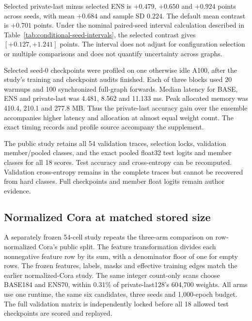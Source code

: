 Selected private-last minus selected ENS is $+0.479$, $+0.650$ and
$+0.924$ points across seeds, with mean $+0.684$ and sample SD $0.224$.
The default mean contrast is $+0.701$ points. Under the nominal paired-seed
interval calculation described in Table~\ref{tab:conditional-seed-intervals},
the selected contrast gives $[+0.127,+1.241]$ points. The interval does
not adjust for configuration selection or multiple comparisons and does
not quantify uncertainty across graphs.

Selected seed-0 checkpoints were profiled on one otherwise idle A100,
after the study's training and checkpoint audits finished. Each of three
blocks used 20 warmups and 100 synchronized full-graph forwards.
Median latency for BASE, ENS and private-last was 4.481, 8.562 and
11.133 ms. Peak allocated memory was 410.4, 210.1 and 277.8 MB.
Thus the private-last accuracy gain over the ensemble accompanies
higher latency and allocation at almost equal weight count.
The exact timing records and profile source accompany the supplement.

The public study retains all 54 validation traces, selection locks,
validation member/pooled classes, and the exact pooled float32 test
logits and member classes for all 18 scores. Test accuracy and
cross-entropy can be recomputed. Validation cross-entropy remains in
the complete traces but cannot be recovered from hard classes.
Full checkpoints and member float logits remain author evidence.


\subsection{Normalized Cora at matched stored size}
A separately frozen 54-cell study repeats the three-arm comparison on
row-normalized Cora's public split. The feature transformation divides
each nonnegative feature row by its sum, with a denominator floor of
one for empty rows. The frozen features, labels, masks and effective
training edges match the earlier normalized-Cora study. The same
integer count-only scans choose BASE184 and ENS70, within 0.31\% of
private-last128's 604,700 weights. All arms use one runtime, the same
six candidates, three seeds and 1,000-epoch budget. The full validation
matrix is independently locked before all 18 allowed test checkpoints
are scored and replayed.


